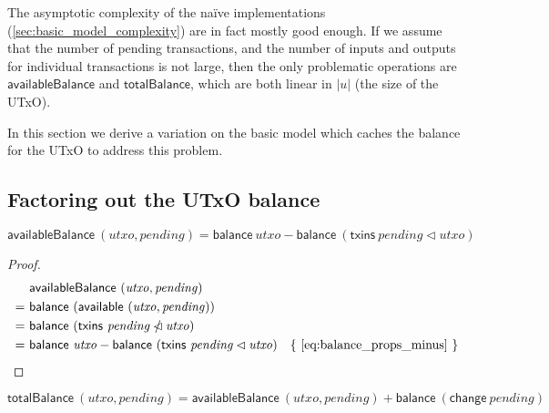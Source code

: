 \documentclass{article}
\newcommand{\restrictdom}{\lhd}
\newcommand{\subtractdom}{\mathbin{\slashed{\restrictdom}}}
\theoremstyle{definition}{
  \newtheorem{lemma}{Lemma}[section] %
  \newtheorem{definition}[lemma]{Definition}
}
\theoremstyle{theorem}{
  \newtheorem{invariant}[lemma]{Invariant}
  \newtheorem{proofobligation}[lemma]{Proof Obligation}
}
\numberwithin{equation}{lemma}
\begin{document}
The asymptotic complexity of the na\"ive implementations
(\cref{sec:basic_model_complexity}) are in fact mostly good enough. If we
assume that the number of pending transactions, and the number of inputs and
outputs for individual transactions is not large, then the only problematic
operations are $\mathsf{availableBalance}$ and $\mathsf{totalBalance}$, which
are both linear in $|u|$ (the size of the UTxO).

In this section we derive a variation on the basic model which caches the
balance for the UTxO to address this problem.


\subsection{Factoring out the UTxO balance}

\begin{lemma}
\begin{equation*}
  \mathsf{availableBalance} ~ (\mathit{utxo}, \mathit{pending})
= \mathsf{balance} ~ \mathit{utxo} - \mathsf{balance} ~ (\mathsf{txins} ~ \mathit{pending} \restrictdom \mathit{utxo})
\end{equation*}
\label{lem:availableBalance}
\end{lemma}

\begin{proof}
\begin{align*}
  & ~ \mathsf{availableBalance} ~ (\mathit{utxo}, \mathit{pending}) \\
= & ~ \mathsf{balance} ~ (\mathsf{available} ~ (\mathit{utxo}, \mathit{pending})) \\
= & ~ \mathsf{balance} ~ (\mathsf{txins} ~ \mathit{pending} \subtractdom \mathit{utxo}) \\
= & ~ \mathsf{balance} ~ \mathit{utxo} - \mathsf{balance} ~ (\mathsf{txins} ~ \mathit{pending} \restrictdom \mathit{utxo})
  & \text{\{ \eqref{eq:balance_props_minus} \}}
\end{align*}
\end{proof}

\begin{lemma}
\begin{equation*}
  \mathsf{totalBalance} ~ (\mathit{utxo}, \mathit{pending})
= \mathsf{availableBalance} ~ (\mathit{utxo}, \mathit{pending})
+ \mathsf{balance} ~ (\mathsf{change} ~ \mathit{pending})
\end{equation*}
\label{lem:totalBalance}
\end{lemma}
\end{document}
